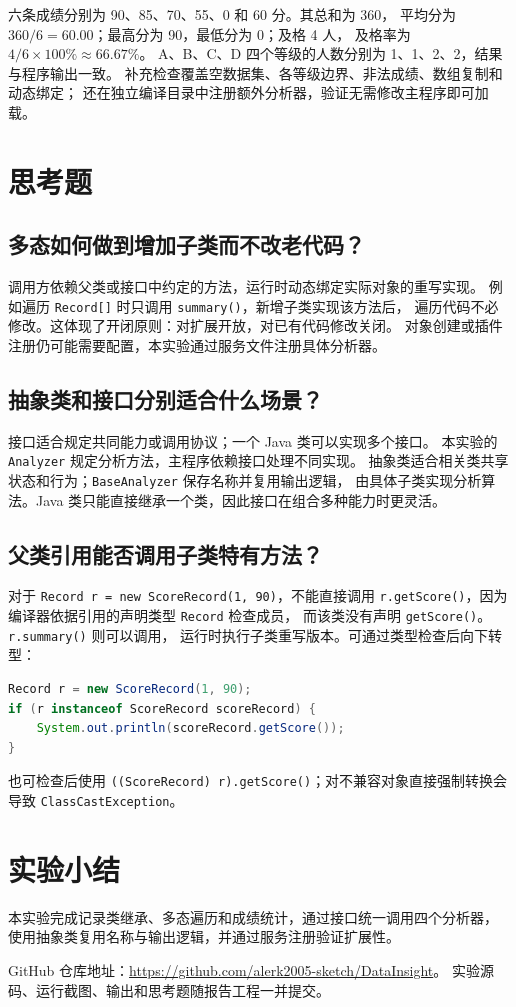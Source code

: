 六条成绩分别为 90、85、70、55、0 和 60 分。其总和为 360，
平均分为 $360/6=60.00$；最高分为 90，最低分为 0；及格 4 人，
及格率为 $4/6\times 100\%\approx 66.67\%$。
A、B、C、D 四个等级的人数分别为 1、1、2、2，结果与程序输出一致。
补充检查覆盖空数据集、各等级边界、非法成绩、数组复制和动态绑定；
还在独立编译目录中注册额外分析器，验证无需修改主程序即可加载。

\section{思考题}
\subsection{多态如何做到增加子类而不改老代码？}
调用方依赖父类或接口中约定的方法，运行时动态绑定实际对象的重写实现。
例如遍历 \texttt{Record[]} 时只调用 \texttt{summary()}，新增子类实现该方法后，
遍历代码不必修改。这体现了开闭原则：对扩展开放，对已有代码修改关闭。
对象创建或插件注册仍可能需要配置，本实验通过服务文件注册具体分析器。

\subsection{抽象类和接口分别适合什么场景？}
接口适合规定共同能力或调用协议；一个 Java 类可以实现多个接口。
本实验的 \texttt{Analyzer} 规定分析方法，主程序依赖接口处理不同实现。
抽象类适合相关类共享状态和行为；\texttt{BaseAnalyzer} 保存名称并复用输出逻辑，
由具体子类实现分析算法。Java 类只能直接继承一个类，因此接口在组合多种能力时更灵活。

\subsection{父类引用能否调用子类特有方法？}
对于 \texttt{Record r = new ScoreRecord(1, 90)}，不能直接调用
\texttt{r.getScore()}，因为编译器依据引用的声明类型 \texttt{Record} 检查成员，
而该类没有声明 \texttt{getScore()}。\texttt{r.summary()} 则可以调用，
运行时执行子类重写版本。可通过类型检查后向下转型：
\begin{lstlisting}[language=java]
Record r = new ScoreRecord(1, 90);
if (r instanceof ScoreRecord scoreRecord) {
    System.out.println(scoreRecord.getScore());
}
\end{lstlisting}
也可检查后使用 \texttt{((ScoreRecord) r).getScore()}；对不兼容对象直接强制转换会导致
\texttt{ClassCastException}。

\section{实验小结}
本实验完成记录类继承、多态遍历和成绩统计，通过接口统一调用四个分析器，
使用抽象类复用名称与输出逻辑，并通过服务注册验证扩展性。

GitHub 仓库地址：\url{https://github.com/alerk2005-sketch/DataInsight}。
实验源码、运行截图、输出和思考题随报告工程一并提交。
